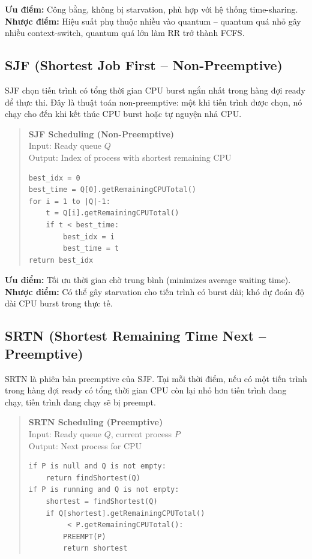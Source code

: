 \textbf{Ưu điểm:} Công bằng, không bị starvation, phù hợp với hệ thống time-sharing.
\textbf{Nhược điểm:} Hiệu suất phụ thuộc nhiều vào quantum -- quantum quá nhỏ gây nhiều context-switch, quantum quá lớn làm RR trở thành FCFS.

\subsection{SJF (Shortest Job First -- Non-Preemptive)}

SJF chọn tiến trình có tổng thời gian CPU burst ngắn nhất trong hàng đợi ready để thực thi. Đây là thuật toán non-preemptive: một khi tiến trình được chọn, nó chạy cho đến khi kết thúc CPU burst hoặc tự nguyện nhả CPU.

\begin{quote}
\textbf{SJF Scheduling (Non-Preemptive)}\\
Input: Ready queue $Q$\\
Output: Index of process with shortest remaining CPU\\
\begin{verbatim}
best_idx = 0
best_time = Q[0].getRemainingCPUTotal()
for i = 1 to |Q|-1:
    t = Q[i].getRemainingCPUTotal()
    if t < best_time:
        best_idx = i
        best_time = t
return best_idx
\end{verbatim}
\end{quote}

\textbf{Ưu điểm:} Tối ưu thời gian chờ trung bình (minimizes average waiting time).
\textbf{Nhược điểm:} Có thể gây starvation cho tiến trình có burst dài; khó dự đoán độ dài CPU burst trong thực tế.

\subsection{SRTN (Shortest Remaining Time Next -- Preemptive)}

SRTN là phiên bản preemptive của SJF. Tại mỗi thời điểm, nếu có một tiến trình trong hàng đợi ready có tổng thời gian CPU còn lại nhỏ hơn tiến trình đang chạy, tiến trình đang chạy sẽ bị preempt.

\begin{quote}
\textbf{SRTN Scheduling (Preemptive)}\\
Input: Ready queue $Q$, current process $P$\\
Output: Next process for CPU\\
\begin{verbatim}
if P is null and Q is not empty:
    return findShortest(Q)
if P is running and Q is not empty:
    shortest = findShortest(Q)
    if Q[shortest].getRemainingCPUTotal()
         < P.getRemainingCPUTotal():
        PREEMPT(P)
        return shortest
\end{verbatim}
\end{quote}

